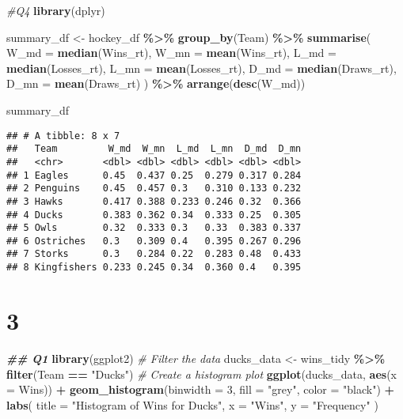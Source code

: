 \documentclass[
]{article}
\newenvironment{Shaded}{\begin{snugshade}}{\end{snugshade}}
\newcommand{\AttributeTok}[1]{\textcolor[rgb]{0.13,0.29,0.53}{#1}}
\newcommand{\CommentTok}[1]{\textcolor[rgb]{0.56,0.35,0.01}{\textit{#1}}}
\newcommand{\DecValTok}[1]{\textcolor[rgb]{0.00,0.00,0.81}{#1}}
\newcommand{\DocumentationTok}[1]{\textcolor[rgb]{0.56,0.35,0.01}{\textbf{\textit{#1}}}}
\newcommand{\FunctionTok}[1]{\textcolor[rgb]{0.13,0.29,0.53}{\textbf{#1}}}
\newcommand{\NormalTok}[1]{#1}
\newcommand{\OtherTok}[1]{\textcolor[rgb]{0.56,0.35,0.01}{#1}}
\newcommand{\SpecialCharTok}[1]{\textcolor[rgb]{0.81,0.36,0.00}{\textbf{#1}}}
\newcommand{\StringTok}[1]{\textcolor[rgb]{0.31,0.60,0.02}{#1}}
\begin{document}
\begin{Shaded}
\begin{Highlighting}[]
\CommentTok{\#Q4}
\FunctionTok{library}\NormalTok{(dplyr)}

\NormalTok{summary\_df }\OtherTok{\textless{}{-}}\NormalTok{ hockey\_df }\SpecialCharTok{\%\textgreater{}\%}
  \FunctionTok{group\_by}\NormalTok{(Team) }\SpecialCharTok{\%\textgreater{}\%}
  \FunctionTok{summarise}\NormalTok{(}
    \AttributeTok{W\_md =} \FunctionTok{median}\NormalTok{(Wins\_rt),}
    \AttributeTok{W\_mn =} \FunctionTok{mean}\NormalTok{(Wins\_rt),}
    \AttributeTok{L\_md =} \FunctionTok{median}\NormalTok{(Losses\_rt),}
    \AttributeTok{L\_mn =} \FunctionTok{mean}\NormalTok{(Losses\_rt),}
    \AttributeTok{D\_md =} \FunctionTok{median}\NormalTok{(Draws\_rt),}
    \AttributeTok{D\_mn =} \FunctionTok{mean}\NormalTok{(Draws\_rt)}
\NormalTok{  ) }\SpecialCharTok{\%\textgreater{}\%}
  \FunctionTok{arrange}\NormalTok{(}\FunctionTok{desc}\NormalTok{(W\_md))}

\NormalTok{summary\_df}
\end{Highlighting}
\end{Shaded}

\begin{verbatim}
## # A tibble: 8 x 7
##   Team         W_md  W_mn  L_md  L_mn  D_md  D_mn
##   <chr>       <dbl> <dbl> <dbl> <dbl> <dbl> <dbl>
## 1 Eagles      0.45  0.437 0.25  0.279 0.317 0.284
## 2 Penguins    0.45  0.457 0.3   0.310 0.133 0.232
## 3 Hawks       0.417 0.388 0.233 0.246 0.32  0.366
## 4 Ducks       0.383 0.362 0.34  0.333 0.25  0.305
## 5 Owls        0.32  0.333 0.3   0.33  0.383 0.337
## 6 Ostriches   0.3   0.309 0.4   0.395 0.267 0.296
## 7 Storks      0.3   0.284 0.22  0.283 0.48  0.433
## 8 Kingfishers 0.233 0.245 0.34  0.360 0.4   0.395
\end{verbatim}

\hypertarget{section-4}{%
\section{3}\label{section-4}}

\begin{Shaded}
\begin{Highlighting}[]
\DocumentationTok{\#\# Q1}
\FunctionTok{library}\NormalTok{(ggplot2)}
\CommentTok{\# Filter the data}
\NormalTok{ducks\_data }\OtherTok{\textless{}{-}}\NormalTok{ wins\_tidy }\SpecialCharTok{\%\textgreater{}\%}
  \FunctionTok{filter}\NormalTok{(Team }\SpecialCharTok{==} \StringTok{"Ducks"}\NormalTok{)}
\CommentTok{\# Create a histogram plot}
\FunctionTok{ggplot}\NormalTok{(ducks\_data, }\FunctionTok{aes}\NormalTok{(}\AttributeTok{x =}\NormalTok{ Wins)) }\SpecialCharTok{+}
  \FunctionTok{geom\_histogram}\NormalTok{(}\AttributeTok{binwidth =} \DecValTok{3}\NormalTok{, }\AttributeTok{fill =} \StringTok{"grey"}\NormalTok{, }\AttributeTok{color =} \StringTok{"black"}\NormalTok{) }\SpecialCharTok{+}
  \FunctionTok{labs}\NormalTok{(}
    \AttributeTok{title =} \StringTok{"Histogram of Wins for Ducks"}\NormalTok{,}
    \AttributeTok{x =} \StringTok{"Wins"}\NormalTok{,}
    \AttributeTok{y =} \StringTok{"Frequency"}
\NormalTok{  )}
\end{Highlighting}
\end{Shaded}
\end{document}
